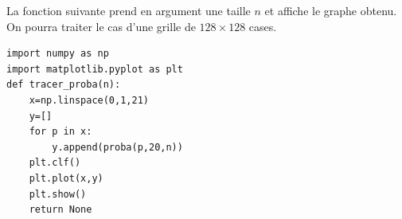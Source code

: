 {La fonction suivante prend en argument une taille $n$ et affiche le graphe obtenu. On pourra traiter le 
cas d'une grille de $128\times 128$ cases.%

\begin{lstlisting}
import numpy as np
import matplotlib.pyplot as plt
def tracer_proba(n):
    x=np.linspace(0,1,21)
    y=[]
    for p in x:
        y.append(proba(p,20,n))
    plt.clf()
    plt.plot(x,y)
    plt.show()
    return None
\end{lstlisting}

%
%
%
%
%
%
%
%
%
%
%
}
